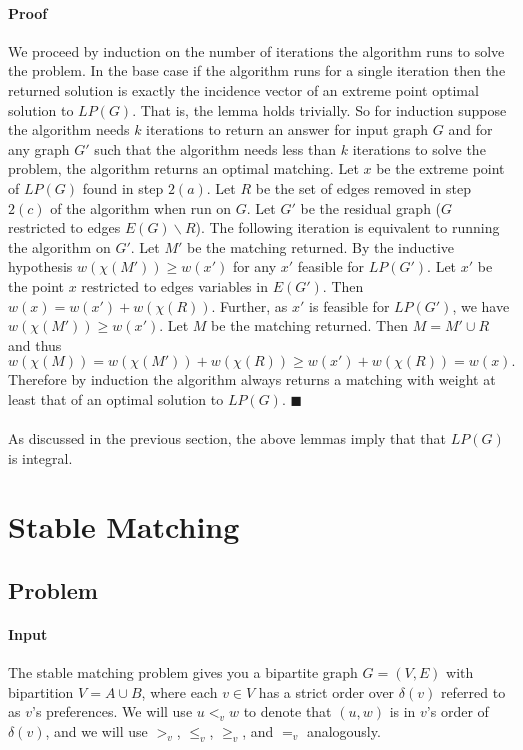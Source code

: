 \paragraph{Proof}
We proceed by induction on the number of iterations the algorithm runs to solve the problem. In the base case if the algorithm runs for a single iteration then the returned solution is exactly the incidence vector of an extreme point optimal solution to $LP(G)$. That is, the lemma holds trivially. So for induction suppose the algorithm needs $k$ iterations to return an answer for input graph $G$ and for any graph $G'$ such that the algorithm needs less than $k$ iterations to solve the problem, the algorithm returns an optimal matching. Let $x$ be the extreme point of $LP(G)$ found in step $2(a)$. Let $R$ be the set of edges removed in step $2(c)$ of the algorithm when run on $G$. Let $G'$ be the residual graph ($G$ restricted to edges $E(G) \backslash R$). The following iteration is equivalent to running the algorithm on $G'$. Let $M'$ be the matching returned. By the inductive hypothesis $w(\chi(M')) \geq w(x')$ for any $x'$ feasible for $LP(G')$. Let $x'$ be the point $x$ restricted to edges variables in $E(G')$. Then $w(x) = w(x') + w(\chi(R))$. Further, as $x'$ is feasible for $LP(G')$, we have
$w(\chi(M')) \geq w(x')$. Let $M$ be the matching returned. Then $M = M' \cup R$ and thus
$$w(\chi(M)) = w(\chi(M')) + w(\chi(R)) \geq w(x') + w(\chi(R)) = w(x).$$
Therefore by induction the algorithm always returns a matching with weight at least that of an optimal solution to $LP(G)$. $\blacksquare$
\paragraph{}
As discussed in the previous section, the above lemmas imply that that $LP(G)$ is integral.
\section{Stable Matching}
\subsection{Problem}
\paragraph{Input}The stable matching problem gives you a bipartite graph $G=(V, E)$ with bipartition $V = A\cup B$, where each $v \in V$ has a strict order over $\delta(v)$ referred to as $v$'s preferences. We will use $u <_v w$ to denote that $(u,w)$ is in $v$'s order of $\delta(v)$, and we will use $>_v$, $\leq_v$, $\geq_v$, and $=_v$ analogously.
